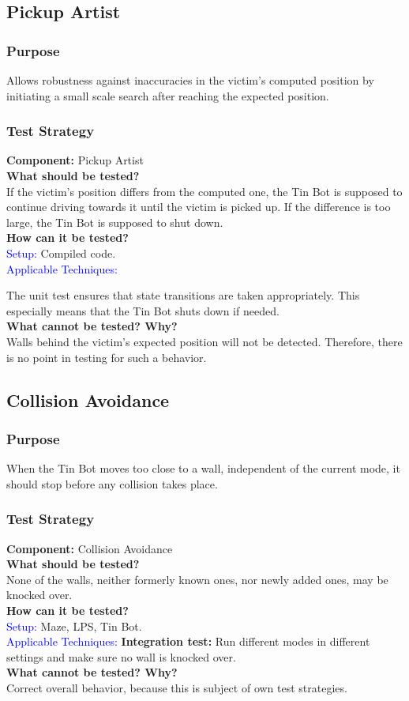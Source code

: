 \documentclass[a4paper,parskip,headheight=38pt]{scrartcl} %
\newcommand{\teststrat}[5]{
    \subsubsection{Test Strategy}
	\textbf{Component:} #1 \\
	\noindent\textbf{What should be tested?} \\
    \noindent #2 \\
	\noindent\textbf{How can it be tested?} \\
    \noindent\textcolor{blue}{Setup:} #3 \\
    \noindent\textcolor{blue}{Applicable Techniques:} #4 \\
	\noindent\textbf{What cannot be tested? Why?} \\
    \noindent #5
}
\newcommand{\BLACK}{\textbf{Integration test: }}
\begin{document}
\subsection{Pickup Artist}
\subsubsection{Purpose}
Allows robustness against inaccuracies in the victim's computed position by
initiating a small scale search after reaching the expected position.
\teststrat{Pickup Artist}{
    If the victim's position differs from the computed one, the Tin Bot is
    supposed to continue driving towards it until the victim is picked up. If
    the difference is too large, the Tin Bot is supposed to shut down.
}{
    Compiled code.
}{


    The unit test ensures that state transitions are taken appropriately.
    This especially means that the Tin Bot shuts down if needed.
}{
    Walls behind the victim's expected position will not be detected. Therefore,
    there is no point in testing for such a behavior.
}

\subsection{Collision Avoidance}
\subsubsection{Purpose}
When the Tin Bot moves too close to a wall, independent of the current mode, it
should stop before any collision takes place.
\teststrat{Collision Avoidance}{
    None of the walls, neither formerly known ones, nor newly added ones, may be
    knocked over.
}{
    Maze, LPS, Tin Bot.
}{
    \BLACK Run different modes in different settings and make sure no
    wall is knocked over.
}{
    Correct overall behavior, because this is subject of own test strategies.
}
\end{document}
